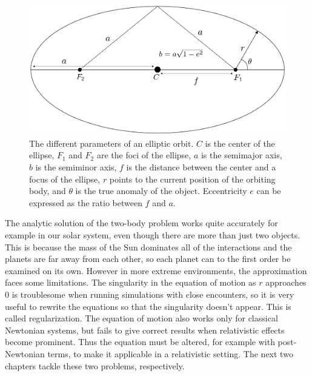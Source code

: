 \documentclass[english, oneside]{HYgradu}
\begin{document}
\begin{figure}[h!tb]
\centering
\includegraphics[width=\textwidth]{../images/ellipse.pdf}
\caption{The different parameters of an elliptic orbit. $C$ is the center of the ellipse, $F_1$ and $F_2$ are the foci of the ellipse, $a$ is the semimajor axis, $b$ is the semiminor axis, $f$ is the distance between the center and a focus of the ellipse, $r$ points to the current position of the orbiting body, and $\theta$ is the true anomaly of the object. Eccentricity $e$ can be expressed as the ratio between $f$ and $a$.}
\label{fig:ellipse}
\end{figure}

The analytic solution of the two-body problem works quite accurately for example in our solar system, even though there are more than just two objects. This is because the mass of the Sun dominates all of the interactions and the planets are far away from each other, so each planet can to the first order be examined on its own. However in more extreme environments, the approximation faces some limitations. The singularity in the equation of motion as $r$ approaches 0 is troublesome when running simulations with close encounters, so it is very useful to rewrite the equations so that the singularity doesn't appear. This is called regularization. The equation of motion also works only for classical Newtonian systems, but fails to give correct results when relativistic effects become prominent. Thus the equation must be altered, for example with post-Newtonian terms, to make it applicable in a relativistic setting. The next two chapters tackle these two problems, respectively.

\end{document}
